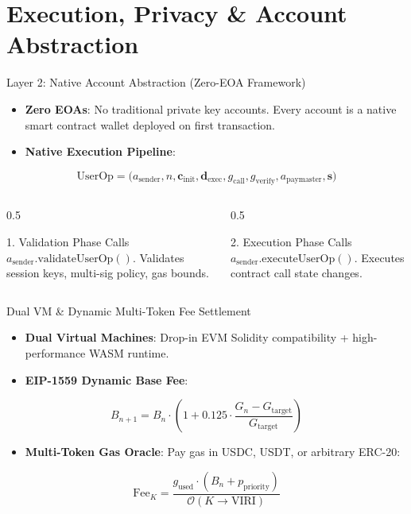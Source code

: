 \documentclass[10pt]{beamer}
\begin{document}
\section{Execution, Privacy \& Account Abstraction}

\begin{frame}{Layer 2: Native Account Abstraction (Zero-EOA Framework)}
  \begin{itemize}
    \item \textbf{Zero EOAs}: No traditional private key accounts. Every account is a native smart contract wallet deployed on first transaction.
    \item \textbf{Native Execution Pipeline}:
  \end{itemize}
  $$\text{UserOp} = \Big( a_{\text{sender}}, n, \mathbf{c}_{\text{init}}, \mathbf{d}_{\text{exec}}, g_{\text{call}}, g_{\text{verify}}, a_{\text{paymaster}}, \mathbf{s} \Big)$$
  
  \begin{columns}
    \begin{column}{0.5\textwidth}
      \begin{block}{1. Validation Phase}
        Calls $a_{\text{sender}}.\text{validateUserOp}()$. Validates session keys, multi-sig policy, gas bounds.
      \end{block}
    \end{column}
    \begin{column}{0.5\textwidth}
      \begin{block}{2. Execution Phase}
        Calls $a_{\text{sender}}.\text{executeUserOp}()$. Executes contract call state changes.
      \end{block}
    \end{column}
  \end{columns}
\end{frame}

\begin{frame}{Dual VM & Dynamic Multi-Token Fee Settlement}
  \begin{itemize}
    \item \textbf{Dual Virtual Machines}: Drop-in EVM Solidity compatibility + high-performance WASM runtime.
    \item \textbf{EIP-1559 Dynamic Base Fee}:
  \end{itemize}
  $$B_{n+1} = B_n \cdot \left( 1 + 0.125 \cdot \frac{G_n - G_{\text{target}}}{G_{\text{target}}} \right)$$
  \begin{itemize}
    \item \textbf{Multi-Token Gas Oracle}: Pay gas in USDC, USDT, or arbitrary ERC-20:
  \end{itemize}
  $$\text{Fee}_K = \frac{g_{\text{used}} \cdot \left( B_n + p_{\text{priority}} \right)}{\mathcal{O}(K \rightarrow \text{VIRI})}$$
\end{frame}
\end{document}

